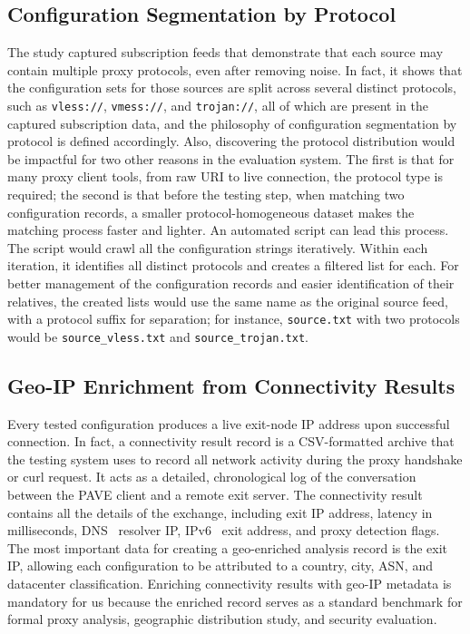 \documentclass[10pt,conference]{IEEEtran}
\begin{document}
\subsection{Configuration Segmentation by Protocol}
The study captured subscription feeds that demonstrate that each source may contain multiple proxy protocols, even after removing noise.
In fact, it shows that the configuration sets for those sources are split across several distinct protocols, such as \texttt{vless://}, \texttt{vmess://}, and \texttt{trojan://}, all of which are present in the captured subscription data, and the philosophy of configuration segmentation by protocol is defined accordingly.
Also, discovering the protocol distribution would be impactful for two other reasons in the evaluation system.
The first is that for many proxy client tools, from raw URI to live connection, the protocol type is required; the second is that before the testing step, when matching two configuration records, a smaller protocol-homogeneous dataset makes the matching process faster and lighter.
An automated script can lead this process.
The script would crawl all the configuration strings iteratively.
Within each iteration, it identifies all distinct protocols and creates a filtered list for each.
For better management of the configuration records and easier identification of their relatives, the created lists would use the same name as the original source feed, with a protocol suffix for separation; for instance, \texttt{source.txt} with two protocols would be \texttt{source\_vless.txt} and \texttt{source\_trojan.txt}.

\subsection{Geo-IP Enrichment from Connectivity Results}
Every tested configuration produces a live exit-node IP address upon successful connection.
In fact, a connectivity result record is a CSV-formatted archive that the testing system uses to record all network activity during the proxy handshake or curl request.
It acts as a detailed, chronological log of the conversation between the PAVE client and a remote exit server.
The connectivity result contains all the details of the exchange, including exit IP address, latency in milliseconds, DNS~\cite{rfc1034} resolver IP, IPv6~\cite{rfc8200} exit address, and proxy detection flags.
The most important data for creating a geo-enriched analysis record is the exit IP, allowing each configuration to be attributed to a country, city, ASN, and datacenter classification.
Enriching connectivity results with geo-IP metadata is mandatory for us because the enriched record serves as a standard benchmark for formal proxy analysis, geographic distribution study, and security evaluation.
\end{document}

